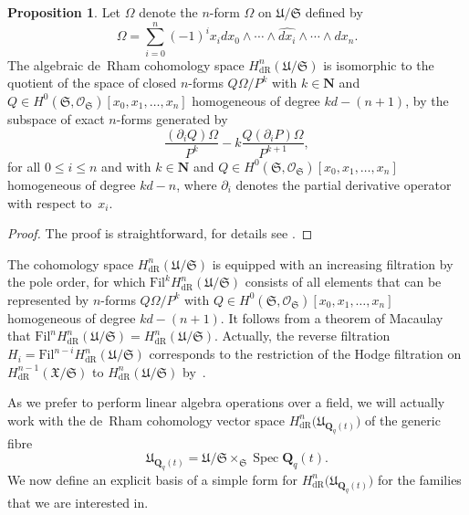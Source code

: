 \documentclass[a4paper,11pt]{article}
\numberwithin{equation}{section}
\newcommand{\NN}{\mathbf{N}} %
\newcommand{\QQ}{\mathbf{Q}} %
\DeclareMathOperator{\Spec}{Spec}        %
\providecommand{\HdR}{H_{\text{dR}}}    %
\theoremstyle{definition}
\newtheorem{prop}[thm]{Proposition}
\begin{document}
\begin{prop}
Let $\Omega$ denote the $n$-form $\Omega$ on $\mathfrak{U}/\mathfrak{S}$ 
defined by 
\begin{equation*}
\Omega = \sum_{i=0}^n (-1)^i x_i d x_0 \wedge \dotsb \wedge \widehat{d x_i} \wedge \dotsb \wedge d x_n.
\end{equation*}
The algebraic de~Rham cohomology space $\HdR^{n}(\mathfrak{U}/\mathfrak{S})$ 
is isomorphic to the quotient of the space of closed $n$-forms 
$Q \Omega / P^k$ with $k \in \NN$ and 
$Q \in H^0(\mathfrak{S},\mathcal{O}_{\mathfrak{S}})[x_0, x_1, \dotsc, x_n]$ 
homogeneous of degree $k d - (n + 1)$, by the subspace of exact $n$-forms 
generated by
\begin{equation*} 
\frac{(\partial_i Q) \Omega}{P^k} - k \frac{Q (\partial_i P) \Omega}{P^{k+1}},
\end{equation*}
for all $0 \leq i \leq n$ and with $k \in \NN$ and 
$Q \in H^0(\mathfrak{S}, \mathcal{O}_{\mathfrak{S}})[x_0, x_1, \dotsc, x_n]$ 
homogeneous of degree $kd-n$, where $\partial_i$ denotes the partial 
derivative operator with respect to~$x_i$.
\end{prop}

\begin{proof}
The proof is straightforward, for details see \citep{Griffiths1969}.
\end{proof}

The cohomology space $\HdR^{n}(\mathfrak{U}/\mathfrak{S})$ is 
equipped with an increasing filtration by the pole order, for which 
$\mbox{Fil}^k \HdR^{n}(\mathfrak{U}/\mathfrak{S})$ consists of all elements 
that can be represented by $n$-forms $Q \Omega / P^k$ with 
$Q \in H^0(\mathfrak{S},\mathcal{O}_{\mathfrak{S}})[x_0, x_1, \dotsc, x_n]$ 
homogeneous of degree $kd - (n + 1)$.  It follows from a theorem of 
Macaulay~\citep[\S 4, (4.11)]{Griffiths1969} that 
$\mbox{Fil}^n \HdR^{n}(\mathfrak{U}/\mathfrak{S}) = \HdR^{n}(\mathfrak{U}/\mathfrak{S})$. 
Actually, the reverse filtration $H_i=\mbox{Fil}^{n-i} \HdR^{n}(\mathfrak{U}/\mathfrak{S})$
corresponds to the restriction of the Hodge filtration on 
$\HdR^{n-1}(\mathfrak{X}/\mathfrak{S})$ to $\HdR^{n}(\mathfrak{U}/\mathfrak{S})$ 
by~\citep{Griffiths1969}.

As we prefer to perform linear 
algebra operations over a field, we will actually work with the de~Rham 
cohomology vector space $\HdR^{n}\bigl(\mathfrak{U}_{\QQ_q(t)}\bigr)$ of 
the generic fibre 
\[
\mathfrak{U}_{\QQ_q(t)} = \mathfrak{U}/\mathfrak{S} \times_{\mathfrak{S}} \Spec \QQ_q(t).
\] 
We now define an explicit basis of a simple form for 
$\HdR^{n}\bigl(\mathfrak{U}_{\QQ_q(t)}\bigr)$ 
for the families that we are interested in.
\end{document}
